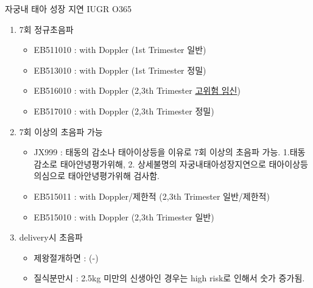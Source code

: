 \begin{commentbox}{자궁내 태아 성장 지연 IUGR O365}
\begin{enumerate}\tightlist
\item 7회 정규초음파
	\begin{itemize}\tightlist
	\item EB511010 : with Doppler (1st Trimester 일반) 
	\item EB513010 : with Doppler (1st Trimester 정밀) 
	\item EB516010 : with Doppler (2,3th Trimester \uline{고위험 임신}) 
	\item EB517010 : with Doppler (2,3th Trimester 정밀) 
	\end{itemize}
\item 7회 이상의 초음파 가능
	\begin{itemize}\tightlist
	\item JX999 : 태동의 감소나 태아이상등을 이유로 7회 이상의 초음파 가능. 1.태동감소로 태아안녕평가위해, 2. 상세불명의 자궁내태아성장지연으로 태아이상등의심으로 태아안녕평가위해 검사함.
	\item EB515011 : with Doppler/제한적 (2,3th Trimester 일반/제한적)
	\item EB515010 : with Doppler (2,3th Trimester 일반)
	\end{itemize}	
\item delivery시 초음파
	\begin{itemize}\tightlist
	\item 제왕절개하면 : (-)
	\item 질식분만시 : 2.5kg 미만의 신생아인 경우는 high risk로 인해서 숫가 증가됨.
	\end{itemize}
\end{enumerate}
\end{commentbox}

